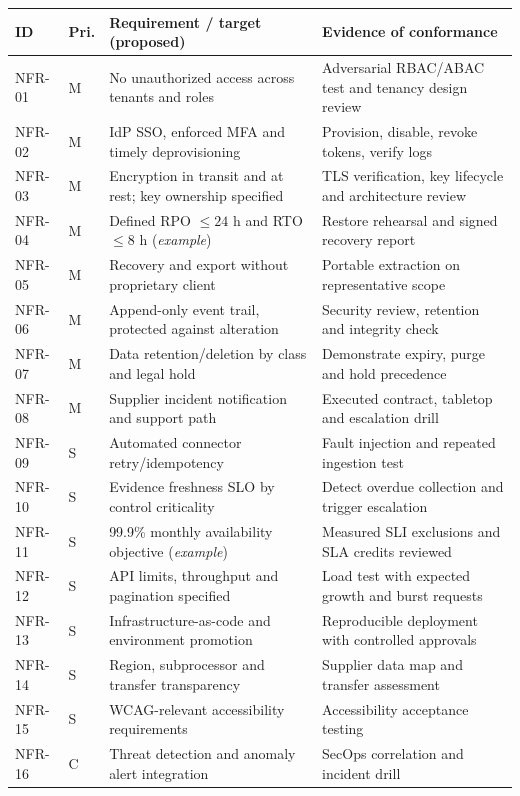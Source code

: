 \documentclass[10pt,letterpaper]{article}
\begin{document}
\begin{longtable}{@{}L{0.60in}L{0.37in}L{2.45in}L{2.94in}@{}}
\toprule
\textbf{ID} & \textbf{Pri.} & \textbf{Requirement / target (proposed)} & \textbf{Evidence of conformance}\\\midrule\endhead
NFR-01 & M & No unauthorized access across tenants and roles & Adversarial RBAC/ABAC test and tenancy design review\\
NFR-02 & M & IdP SSO, enforced MFA and timely deprovisioning & Provision, disable, revoke tokens, verify logs\\
NFR-03 & M & Encryption in transit and at rest; key ownership specified & TLS verification, key lifecycle and architecture review\\
NFR-04 & M & Defined RPO $\leq 24$ h and RTO $\leq 8$ h (\emph{example}) & Restore rehearsal and signed recovery report\\
NFR-05 & M & Recovery and export without proprietary client & Portable extraction on representative scope\\
NFR-06 & M & Append-only event trail, protected against alteration & Security review, retention and integrity check\\
NFR-07 & M & Data retention/deletion by class and legal hold & Demonstrate expiry, purge and hold precedence\\
NFR-08 & M & Supplier incident notification and support path & Executed contract, tabletop and escalation drill\\
NFR-09 & S & Automated connector retry/idempotency & Fault injection and repeated ingestion test\\
NFR-10 & S & Evidence freshness SLO by control criticality & Detect overdue collection and trigger escalation\\
NFR-11 & S & 99.9\% monthly availability objective (\emph{example}) & Measured SLI exclusions and SLA credits reviewed\\
NFR-12 & S & API limits, throughput and pagination specified & Load test with expected growth and burst requests\\
NFR-13 & S & Infrastructure-as-code and environment promotion & Reproducible deployment with controlled approvals\\
NFR-14 & S & Region, subprocessor and transfer transparency & Supplier data map and transfer assessment\\
NFR-15 & S & WCAG-relevant accessibility requirements & Accessibility acceptance testing\\
NFR-16 & C & Threat detection and anomaly alert integration & SecOps correlation and incident drill\\
\bottomrule
\end{longtable}
\normalsize
\end{document}
